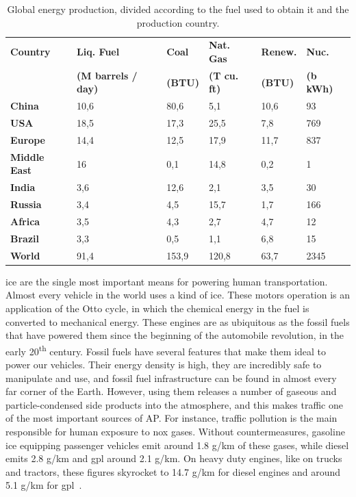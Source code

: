 \begin{table}[htpb]
    \centering
    \small
    \caption{Global energy production, divided according to the fuel
    used to obtain it and the production country.}
    \label{tab:global_energy_consumption}
    \begin{tabularx}{\textwidth}{lXXXXX}
    \toprule
    \textbf{Country} & \textbf{Liq. Fuel} &
    \textbf{Coal} & \textbf{Nat. Gas} &
    \textbf{Renew.} & \textbf{Nuc.} \\ 
                    &\textbf{\tiny{(M barrels /
    day)}}&\textbf{\tiny{(BTU)}}&\textbf{\tiny{(T cu.
                    ft)}}&\textbf{\tiny{(BTU)}}&\textbf{\tiny{(b kWh)}}\\\midrule
    \textbf{China} & 10,6 & 80,6 & 5,1 & 10,6 & 93 \\
    \textbf{USA} & 18,5 & 17,3 & 25,5 & 7,8 & 769 \\
    \textbf{Europe} & 14,4 & 12,5 & 17,9 & 11,7 & 837 \\
    \textbf{Middle East} & 16 & 0,1 & 14,8 & 0,2 & 1 \\
    \textbf{India} & 3,6 & 12,6 & 2,1 & 3,5 & 30 \\
    \textbf{Russia} & 3,4 & 4,5 & 15,7 & 1,7 & 166 \\
    \textbf{Africa} & 3,5 & 4,3 & 2,7 & 4,7 & 12 \\
    \textbf{Brazil} & 3,3 & 0,5 & 1,1 & 6,8 & 15 \\
    \textbf{World} & 91,4 & 153,9 & 120,8 & 63,7 & 2345 \\ \bottomrule
    \end{tabularx}
\end{table}

\gls{ice} are the single most important means for powering human
transportation. Almost every vehicle in the world uses a kind of
\gls{ice}. These motors operation is an application of the Otto cycle,
in which the chemical energy in the fuel is converted to mechanical
energy. These engines are as ubiquitous as the fossil fuels that have
powered them since the beginning of the automobile revolution, in the
early 20\textsuperscript{th} century. Fossil fuels have several features
that make them ideal to power our vehicles. Their energy density is
high, they are incredibly safe to manipulate and use, and fossil fuel
infrastructure can be found in almost every far corner of the Earth.
However, using them releases a number of gaseous and particle-condensed
side products into the atmosphere, and this makes traffic one of the
most important sources of \gls{AP}. For instance, traffic pollution is
the main responsible for human exposure to \gls{nox} gases. Without
countermeasures, gasoline \gls{ice} equipping passenger vehicles emit
around 1.8 g/km of these gases, while diesel emits 2.8 g/km and
\gls{gpl} around 2.1 g/km. On heavy duty engines, like on trucks and
tractors, these figures skyrocket to 14.7 g/km for diesel engines and
around 5.1 g/km for \gls{gpl}~\cite{CABI2019}.

